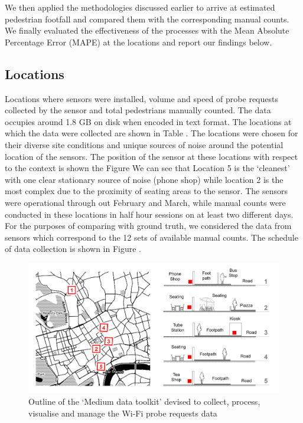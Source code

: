 We then applied the methodologies discussed earlier to arrive at estimated pedestrian footfall and compared them with the corresponding manual counts.
We finally evaluated the effectiveness of the processes with the Mean Absolute Percentage Error (MAPE) at the locations and report our findings below.

\subsection{Locations}

Locations where sensors were installed, volume and speed of probe requests collected by the sensor and total pedestrians manually counted.
The data occupies around 1.8 GB on disk when encoded in text format.
The locations at which the data were collected are shown in Table .
The locations were chosen for their diverse site conditions and unique sources of noise around the potential location of the sensors.
The position of the sensor at these locations with respect to the context is shown the Figure 
We can see that Location 5 is the `cleanest' with one clear stationary source of noise (phone shop) while location 2 is the most complex due to the proximity of seating areas to the sensor.
The sensors were operational through out February and March, while manual counts were conducted in these locations in half hour sessions on at least two different days.
For the purposes of comparing with ground truth, we considered the data from sensors which correspond to the 12 sets of available manual counts.
The schedule of data collection is shown in Figure .

\begin{figure}
  \centering
  \includegraphics[trim={20 20 20 20},clip, width=\textwidth]{images/pilot-study-locations.png}
  \caption{Outline of the `Medium data toolkit' devised to collect, process, visualise and manage the Wi-Fi probe requests data}
  \label{figure:literature:tech:timeline}
\end{figure}

